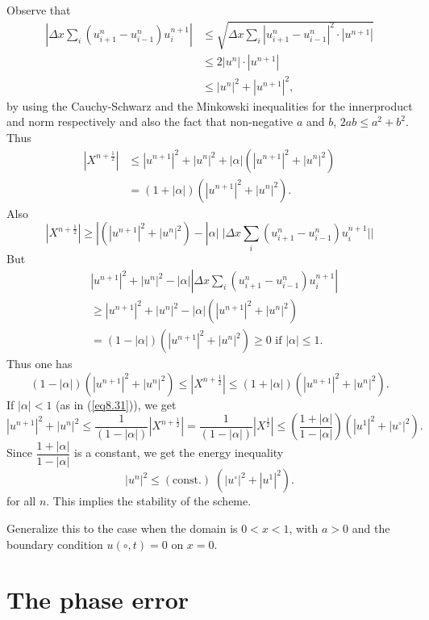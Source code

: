 Observe that 
\begin{align*}
|\Delta x \sum\limits_i (u^n_{i+1} - u^n_{i-1}) u^{n+1}_i| &  \leq \sqrt{\Delta x \sum\limits_i |u^n_{i+1} - u^n_{i-1}|^2 \cdot |u^{n+1}|}\\
& \leq 2 |u^n| \cdot |u^{n+1}|\\
& \leq |u^n|^2 + |u^{n+1}|^2,
\end{align*}
by using the Cauchy-Schwarz and the Minkowski inequalities for the innerproduct and norm respectively and also the fact that non-negative $a$ and $b$, $2ab \leq a^2 + b^2$. Thus
\begin{align*}
|X^{n+\frac{1}{2}}|& \leq |u^{n+1}|^2 + |u^n|^2 + |\alpha| (|u^{n+1}|^2 + |u^n|^2)\\
& = (1+|\alpha|) (|u^{n+1}|^2 + |u^n|^2) .
\end{align*}
Also
$$
|X^{n+\frac{1}{2}}| \geq |(|u^{n+1}|^2 + |u^n|^2) - |\alpha| \; | \Delta x \sum\limits_i (u^n_{i+1} - u^n_{i-1}) u^{n+1}_i ||
$$
But\pageoriginale
\begin{align*} 
& |u^{n+1}|^2 + |u^n|^2 - |\alpha| | \Delta x \sum\limits_i (u^n_{i+1} - u^n_{i-1}) u^{n+1}_i |\\
& \geq |u^{n+1}|^2 + |u^n|^2 - |\alpha| (|u^{n+1}|^2 + |u^n|^2)\\
& = (1-|\alpha|) (|u^{n+1}|^2 + |u^n|^2) \geq 0 \text{ if } |\alpha| \leq 1. 
\end{align*}
Thus one has 
\begin{equation*}
(1-|\alpha|) (|u^{n+1}|^2 + |u^n|^2) \leq |X^{n+\frac{1}{2}}| \leq ( 1+|\alpha|) (|u^{n+1}|^2 + |u^n|^2). \tag{8.36}\label{eq8.36}
\end{equation*}
If $|\alpha| <1$ (as in (\ref{eq8.31})), we get 
$$
|u^{n+1}|^2 + |u^n|^2 \leq \frac{1}{(1 - |\alpha|)}
|X^{n+\frac{1}{2}}| = \frac{1}{(1-|\alpha|)}  |X^{\frac{1}{2}}| \leq
\left(\frac{1+|\alpha|}{1-|\alpha|}\right) (|u^{1}|^2 + |u^\circ|^2). 
$$
Since $\dfrac{1+|\alpha|}{1-|\alpha|}$ is a constant, we get the energy inequality
$$
|u^n|^2 \leq (\text{const.}) \; (|u^\circ|^2 + |u^1|^2). 
$$
for all $n$. This implies the stability of the scheme.

\begin{exercise}\label{chap8:exer8.6}
Generalize this to the case when the domain is $0 < x < 1$, with $a  >0$ and the boundary condition $u(\circ, t) = 0 $ on $x=0$.
\end{exercise}

\section{The phase error}\label{chap8:sec8.8}

